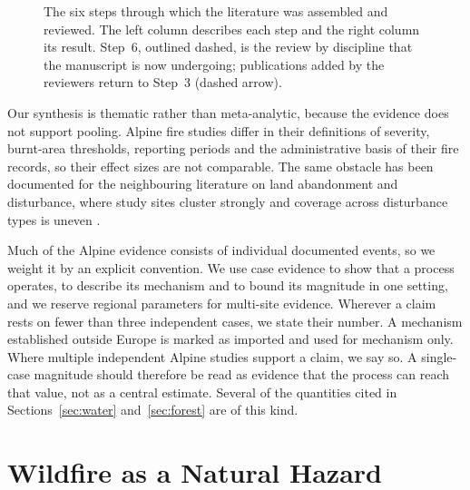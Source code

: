 \documentclass[11pt,a4paper]{article}
\begin{document}
\begin{figure}[H]
\caption{The six steps through which the literature was assembled and reviewed. The left column describes each step and the right column its result. Step~6, outlined dashed, is the review by discipline that the manuscript is now undergoing; publications added by the reviewers return to Step~3 (dashed arrow).}
\label{fig:flow}
\end{figure}

Our synthesis is thematic rather than meta-analytic, because the evidence does not support pooling. Alpine fire studies differ in their definitions of severity, burnt-area thresholds, reporting periods and the administrative basis of their fire records, so their effect sizes are not comparable. The same obstacle has been documented for the neighbouring literature on land abandonment and disturbance, where study sites cluster strongly and coverage across disturbance types is uneven \citep{mantero_influence_2020}.

Much of the Alpine evidence consists of individual documented events, so we weight it by an explicit convention. We use case evidence to show that a process operates, to describe its mechanism and to bound its magnitude in one setting, and we reserve regional parameters for multi-site evidence. Wherever a claim rests on fewer than three independent cases, we state their number. A mechanism established outside Europe is marked as imported and used for mechanism only. Where multiple independent Alpine studies support a claim, we say so. A single-case magnitude should therefore be read as evidence that the process can reach that value, not as a central estimate. Several of the quantities cited in Sections~\ref{sec:water} and~\ref{sec:forest} are of this kind.

\section{Wildfire as a Natural Hazard}
\label{sec:hazard}
\end{document}
